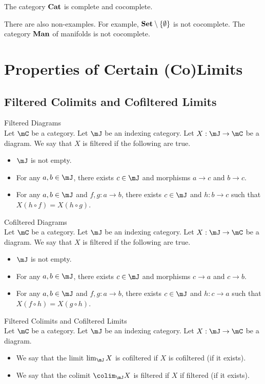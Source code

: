 \documentclass[a4paper]{article}
\begin{document}
\begin{prp}{}{} The category $\bold{Cat}$ is complete and cocomplete. 
\end{prp}

There are also non-examples. For example, $\bold{Set}\setminus\{\emptyset\}$ is not cocomplete. The category $\bold{Man}$ of manifolds is not cocomplete. 

\pagebreak
\section{Properties of Certain (Co)Limits}
\subsection{Filtered Colimits and Cofiltered Limits}
\begin{defn}{Filtered Diagrams}{}\\
Let $\mC$ be a category. Let $\mJ$ be an indexing category. Let $X:\mJ\to\mC$ be a diagram. We say that $X$ is filtered if the following are true. 
\begin{itemize}
\item $\mJ$ is not empty. 
\item For any $a,b\in\mJ$, there exists $c\in\mJ$ and morphisms $a\to c$ and $b\to c$. 
\item For any $a,b\in\mJ$ and $f,g:a\to b$, there exists $c\in\mJ$ and $h:b\to c$ such that $X(h\circ f)=X(h\circ g)$. 
\end{itemize}
\end{defn}

\begin{defn}{Cofiltered Diagrams}{}\\
Let $\mC$ be a category. Let $\mJ$ be an indexing category. Let $X:\mJ\to\mC$ be a diagram. We say that $X$ is filtered if the following are true. 
\begin{itemize}
\item $\mJ$ is not empty. 
\item For any $a,b\in\mJ$, there exists $c\in\mJ$ and morphisms $c\to a$ and $c\to b$. 
\item For any $a,b\in\mJ$ and $f,g:a\to b$, there exists $c\in\mJ$ and $h:c\to a$ such that $X(f\circ h)=X(g\circ h)$. 
\end{itemize}
\end{defn}

\begin{defn}{Filtered Colimits and Cofiltered Limits}{}\\
Let $\mC$ be a category. Let $\mJ$ be an indexing category. Let $X:\mJ\to\mC$ be a diagram. 
\begin{itemize}
\item We say that the limit $\lim_\mJ X$ is cofiltered if $X$ is cofiltered (if it exists). 
\item We say that the colimit $\colim_\mJ X$ is filtered if $X$ if filtered (if it exists). 
\end{itemize}
\end{defn}
\end{document}
